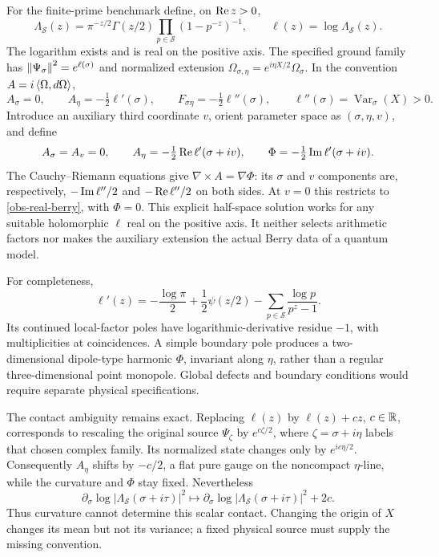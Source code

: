 For the finite-prime benchmark define, on $\operatorname{Re} z>0$,
\begin{equation}
 \Lambda_{\mathcal S}(z)=\pi^{-z/2}\Gamma(z/2)
       \prod_{p\in\mathcal S}(1-p^{-z})^{-1},\qquad
 \ell(z)=\log\Lambda_{\mathcal S}(z).
 \label{obs-local-factor}
\end{equation}
The logarithm exists and is real on the positive axis.  The specified
ground family has $\left\lVert\Psi_\sigma\right\rVert^2=e^{\ell(\sigma)}$ and normalized
extension $\Omega_{\sigma,\eta}=e^{i\eta X/2}\Omega_\sigma$.
In the convention $A=i\left\langle\Omega,d\Omega\right\rangle$,
\begin{equation}
 A_\sigma=0,\qquad A_\eta=-\tfrac12\ell'(\sigma),\qquad
 F_{\sigma\eta}=-\tfrac12\ell''(\sigma),\qquad
 \ell''(\sigma)=\operatorname{Var}_\sigma(X)>0.
 \label{obs-real-berry}
\end{equation}
Introduce an auxiliary third coordinate $v$, orient parameter space as
$(\sigma,\eta,v)$, and define
\begin{equation}
 A_\sigma=A_v=0,\qquad
 A_\eta=-\tfrac12\operatorname{Re}\ell'(\sigma+iv),\qquad
 \Phi=-\tfrac12\operatorname{Im}\ell'(\sigma+iv).
 \label{obs-bogomolny-lift}
\end{equation}
The Cauchy--Riemann equations give
$\nabla\times A=\nabla\Phi$: its $\sigma$ and $v$ components are,
respectively, $-\operatorname{Im}\ell''/2$ and $-\operatorname{Re}\ell''/2$ on both sides.
At $v=0$ this restricts to \eqref{obs-real-berry}, with $\Phi=0$.
This explicit half-space solution works for any suitable holomorphic
$\ell$ real on the positive axis.  It neither selects arithmetic factors
nor makes the auxiliary extension the actual Berry data of a quantum model.

For completeness,
\begin{equation}
 \ell'(z)=-\frac{\log\pi}{2}+\frac12\psi(z/2)
       -\sum_{p\in\mathcal S}\frac{\log p}{p^z-1}.
 \label{obs-log-derivative}
\end{equation}
Its continued local-factor poles have logarithmic-derivative residue $-1$,
with multiplicities at coincidences.  A simple boundary pole produces a
two-dimensional dipole-type harmonic $\Phi$, invariant along $\eta$,
rather than a regular three-dimensional point monopole.  Global defects
and boundary conditions would require separate physical specifications.

The contact ambiguity remains exact.  Replacing $\ell(z)$ by
$\ell(z)+cz$, $c\in\mathbb R$, corresponds to rescaling the original source
$\Psi_\zeta$ by $e^{c\zeta/2}$, where $\zeta=\sigma+i\eta$ labels that
chosen complex family.  Its normalized state changes only by
$e^{ic\eta/2}$.  Consequently $A_\eta$ shifts by $-c/2$, a flat pure gauge
on the noncompact $\eta$-line, while the curvature and $\Phi$ stay fixed.
Nevertheless
\begin{equation}
 \partial_\sigma\log|\Lambda_{\mathcal S}(\sigma+i\tau)|^2
 \longmapsto
 \partial_\sigma\log|\Lambda_{\mathcal S}(\sigma+i\tau)|^2+2c.
 \label{obs-contact-gauge}
\end{equation}
Thus curvature cannot determine this scalar contact.  Changing the origin
of $X$ changes its mean but not its variance; a fixed physical source must
supply the missing convention.

